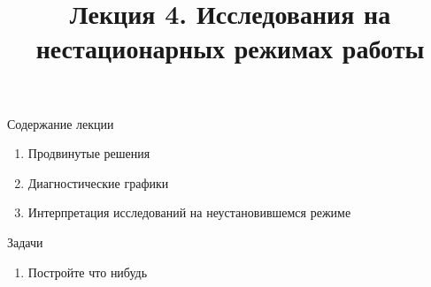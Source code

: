 \documentclass[aspectratio=169, 11pt]{beamer} %
\institute[\university]{\university \\ \faculty}
\title[\docname]{Лекция 4. Исследования на нестационарных режимах работы}
\author[\tutorname]{\small  \tutorname}
\date{\the\year}
\begin{document}
	
	\begin{frame}
		\titlepage
	\end{frame}
	\begin{frame}{Содержание лекции}
		\begin{enumerate}
			\item Продвинутые решения
			\item Диагностические графики
			\item Интерпретация исследований на неустановившемся режиме
		\end{enumerate}
		
	\end{frame}

	
	\begin{frame}{Задачи}
		
		\begin{enumerate}
			\item Постройте что нибудь
		\end{enumerate}
		
		
		
	\end{frame}
	
	
	
\end{document}
